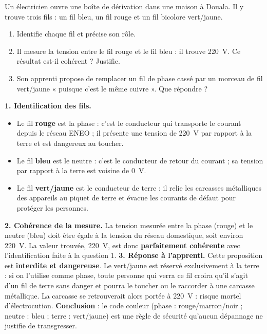 \documentclass[11pt]{article}
\newcommand{\cle}[1]{{\popxbold\color{popdark}#1}}
\begin{document}
\begin{exoresolu}
Un électricien ouvre une boîte de dérivation dans une maison à Douala. Il y trouve trois fils : un fil bleu, un fil rouge et un fil bicolore vert/jaune.
\begin{enumerate}
\item Identifie chaque fil et précise son rôle.
\item Il mesure la tension entre le fil rouge et le fil bleu : il trouve \SI{220}{V}. Ce résultat est-il cohérent ? Justifie.
\item Son apprenti propose de remplacer un fil de phase cassé par un morceau de fil vert/jaune « puisque c'est le même cuivre ». Que répondre ?
\end{enumerate}
\tcblower
\textbf{1. Identification des fils.}
\begin{itemize}
\item Le fil \textbf{rouge} est la \cle{phase} : c'est le conducteur qui transporte le courant depuis le réseau ENEO ; il présente une tension de \SI{220}{V} par rapport à la terre et est dangereux au toucher.
\item Le fil \textbf{bleu} est le \cle{neutre} : c'est le conducteur de retour du courant ; sa tension par rapport à la terre est voisine de \SI{0}{V}.
\item Le fil \textbf{vert/jaune} est le \cle{conducteur de terre} : il relie les carcasses métalliques des appareils au piquet de terre et évacue les courants de défaut pour protéger les personnes.
\end{itemize}
\textbf{2. Cohérence de la mesure.} La tension mesurée entre la phase (rouge) et le neutre (bleu) doit être égale à la tension du réseau domestique, soit environ \SI{220}{V}. La valeur trouvée, \SI{220}{V}, est donc \textbf{parfaitement cohérente} avec l'identification faite à la question 1.
\textbf{3. Réponse à l'apprenti.} Cette proposition est \textbf{interdite et dangereuse}. Le vert/jaune est réservé exclusivement à la terre : si on l'utilise comme phase, toute personne qui verra ce fil croira qu'il s'agit d'un fil de terre sans danger et pourra le toucher ou le raccorder à une carcasse métallique. La carcasse se retrouverait alors portée à \SI{220}{V} : risque mortel d'électrocution.
\textbf{Conclusion} : le code couleur (phase : rouge/marron/noir ; neutre : bleu ; terre : vert/jaune) est une règle de sécurité qu'aucun dépannage ne justifie de transgresser.
\end{exoresolu}
\end{document}
